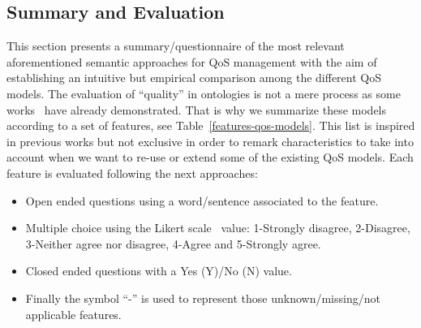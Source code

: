 \subsection{Summary and Evaluation}
This section presents a summary/questionnaire of the most relevant aforementioned semantic approaches for QoS management 
with the aim of establishing an intuitive  but empirical comparison among the different QoS models. 
The evaluation of ``quality'' in ontologies is not a mere process as some works~\cite{DBLP:conf/dexa/dAquinSSS07,DBLP:conf/nldb/SabouFM09} 
have already demonstrated. That is why we summarize these models according to a set of features, see Table~\ref{features-qos-models}. 
This list is inspired in previous works but not exclusive in order to remark characteristics to take into account when 
we want to re-use or extend some of the existing QoS models. Each feature is evaluated following the next approaches:
\begin{itemize}
 \item Open ended questions using a word/sentence associated to the feature.
 \item Multiple choice using the Likert scale~\cite{albaum1997likert} value: 1-Strongly disagree, 2-Disagree, 3-Neither agree nor disagree, 4-Agree and 5-Strongly agree.
 \item Closed ended questions with a Yes (Y)/No (N) value. 
 \item Finally the symbol ``-'' is used to represent those unknown/missing/not applicable features.
\end{itemize}

